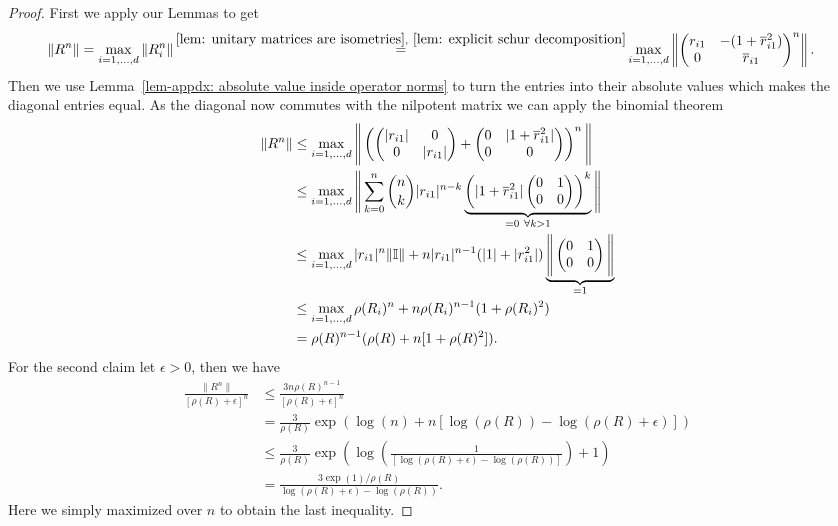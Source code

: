 \begin{proof}
	First we apply our Lemmas to get
	\begin{align*}
		\|R^n\|
		&=\max_{i=1,\dots,\dimension}	\|R_i^n\|
		\xeq{\ref{lem: unitary matrices are isometries},\ \ref{lem: explicit schur decomposition}}
		\max_{i=1,\dots,\dimension}\left\|\begin{pmatrix}
			r_{i1} & -(1+\conjugate{r}_{i1}^2)\\
			0 & \conjugate{r}_{i1}
		\end{pmatrix}^n\right\|.
	\end{align*}
	Then we use Lemma~\ref{lem-appdx: absolute value inside operator norms} to
	turn the entries into their absolute values which makes the diagonal entries
	equal. As the diagonal now commutes with the nilpotent matrix we can apply the
	binomial theorem 
	\begin{align*}
		\|R^n\|
		&\le \max_{i=1,\dots,d}
		\Bigg\|\left(
		\begin{pmatrix}
			|r_{i1}| & 0\\
			0 & |r_{i1}|
		\end{pmatrix}
		+ \begin{pmatrix}
			0 & |1+\overline{r}_{i1}^2|\\
			0 & 0
		\end{pmatrix}
		\right)^n\Bigg\|\\
		&\le \max_{i=1,\dots,d}
		\Bigg\|
		\sum_{k=0}^n \binom{n}{k}
				|r_{i1}|^{n-k}
			\underbrace{
				\left(
				|1+\overline{r}_{i1}^2|
				\begin{pmatrix}
					0 & 1\\
					0 & 0
				\end{pmatrix}
				\right)^k
			}_{=0 \ \forall k>1}
		\Bigg\|\\
		&\le \max_{i=1,\dots,d}
		|r_{i1}|^n \|\mathbb{I}\| + n |r_{i1}|^{n-1}(|1|+|r_{i1}^2|)
		\underbrace{
			\Bigg\|
				\begin{pmatrix}
					0 & 1\\
					0 & 0
				\end{pmatrix}
			\Bigg\|
		}_{=1}
		\\
		&\le \max_{i=1,\dots,d}
		\rho(R_i)^n + n \rho(R_i)^{n-1}(1+\rho(R_i)^2)\\
		&=	\rho(R)^{n-1}(\rho(R) + n [1+\rho(R)^2]).
	\end{align*}
	For the second claim let \(\epsilon>0\), then we have
	\begin{align*}
		\frac{\|R^n\|}{[\rho(R)+\epsilon]^n}
		&\le \frac{3n\rho(R)^{n-1}}{[\rho(R)+\epsilon]^n}\\
		&= \frac{3}{\rho(R)}\exp(\log(n) + n[\log(\rho(R))-\log(\rho(R)+\epsilon)])\\
		&\le \frac{3}{\rho(R)}\exp
		\left(\log\left(\frac{1}{[\log(\rho(R)+\epsilon)-\log(\rho(R))]}\right) + 1\right)\\
		&= \frac{3\exp(1)/\rho(R)}{\log(\rho(R)+\epsilon)-\log(\rho(R))}.
	\end{align*}
	Here we simply maximized over \(n\) to obtain the last inequality.
\end{proof}


